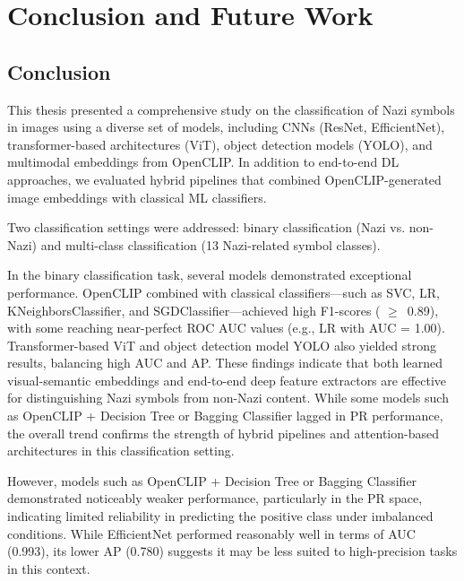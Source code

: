 
\chapter{Conclusion and Future Work}\label{chapter:conclusion-and-future-work}

\section{Conclusion}

This thesis presented a comprehensive study on the classification of Nazi symbols in images using a diverse set of
models, including \ac{CNN}s (\ac{ResNet}, EfficientNet), transformer-based architectures (\ac{ViT}), object detection
models (\ac{YOLO}), and multimodal embeddings from OpenCLIP. In addition to end-to-end \ac{DL} approaches, we
evaluated hybrid pipelines that combined OpenCLIP-generated image embeddings with classical \ac{ML} classifiers.

Two classification settings were addressed: binary classification (Nazi vs. non-Nazi) and multi-class
classification (13 Nazi-related symbol classes).

In the binary classification task, several models demonstrated exceptional performance. OpenCLIP combined with
classical classifiers—such as \ac{SVC}, \ac{LR}, KNeighborsClassifier, and SGDClassifier—achieved high F1-scores (
$\geq$\ 0.89), with
some reaching near-perfect \ac{ROC} \ac{AUC} values (e.g., \ac{LR} with \ac{AUC} = 1.00).
Transformer-based \ac{ViT} and object detection model \ac{YOLO} also yielded strong results, balancing high \ac{AUC} and
\ac{AP}. These findings indicate that both learned visual-semantic embeddings and end-to-end deep feature extractors
are effective for distinguishing Nazi symbols from non-Nazi content. While some models such as OpenCLIP + Decision
Tree or Bagging Classifier lagged in \ac{PR} performance, the overall trend confirms the strength of hybrid
pipelines and attention-based architectures in this classification setting.

However, models such as OpenCLIP + Decision Tree or Bagging Classifier demonstrated noticeably weaker performance,
particularly in the \ac{PR} space, indicating limited reliability in predicting the positive class under imbalanced
conditions. While EfficientNet performed reasonably well in terms of \ac{AUC} (0.993), its lower \ac{AP} (0.780)
suggests it may be less suited to high-precision tasks in this context.

